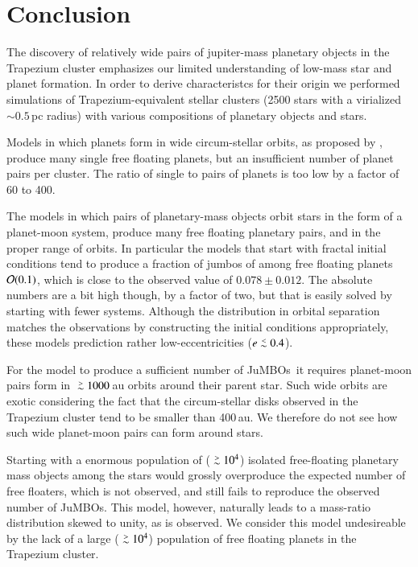 \documentclass[aa]{lib/aa}
\def\apgt{\ {\raise-.5ex\hbox{$\buildrel>\over\sim$}}\ }
\def\aplt{\ {\raise-.5ex\hbox{$\buildrel<\over\sim$}}\ }
\newcommand{\jumbos}{\mbox{JuMBOs}}
\begin{document}
\section{Conclusion}

The discovery of relatively wide pairs of jupiter-mass planetary
objects in the Trapezium cluster emphasizes our limited understanding
of low-mass star and planet formation. In order to derive
characteristcs for their origin we performed simulations of
Trapezium-equivalent stellar clusters (2500 stars with a virialized
$\sim 0.5$\,pc radius) with various compositions of planetary objects
and stars.

Models in which planets form in wide circum-stellar orbits, as
proposed by \cite{2023arXiv231006016W}, produce many single free
floating planets, but an insufficient number of planet pairs per
cluster. The ratio of single to pairs of planets is too low by a
factor of 60 to 400.

The models in which pairs of planetary-mass objects orbit stars in the
form of a planet-moon system, produce many free floating planetary
pairs, and in the proper range of orbits.  In particular the models
that start with fractal initial conditions tend to produce a fraction
of jumbos of among free floating planets ${\cal O}(0.1)$, which is
close to the observed value of $0.078\pm0.012$.  The absolute numbers
are a bit high though, by a factor of two, but that is easily solved
by starting with fewer systems.  Although the distribution in orbital
separation matches the observations by constructing the initial
conditions appropriately, these models prediction rather
low-eccentricities ($e\aplt 0.4$).

For the model to produce a sufficient number of \jumbos\, it requires
planet-moon pairs form in $\apgt 1000$\,au orbits around their parent
star. Such wide orbits are exotic considering the fact that the
circum-stellar disks observed in the Trapezium cluster tend to be
smaller than 400\,au. We therefore do not see how such wide
planet-moon pairs can form around stars.

Starting with a enormous population of ($\apgt 10^4$) isolated
free-floating planetary mass objects among the stars would grossly
overproduce the expected number of free floaters, which is not
observed, and still fails to reproduce the observed number of \jumbos.
This model, however, naturally leads to a mass-ratio distribution
skewed to unity, as is observed. We consider this model undesireable
by the lack of a large ($\apgt 10^4$) population of free floating
planets in the Trapezium cluster.
\end{document}
